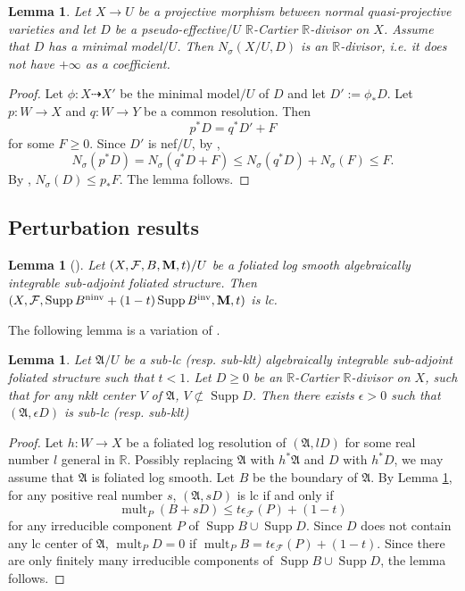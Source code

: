 \documentclass[12pt]{amsart}
\numberwithin{equation}{section}
\newcommand{\Mm}{{\bf{M}}}
\newcommand{\Rr}{\mathbb{R}}
\newcommand{\ninv}{\operatorname{ninv}}
\newcommand{\inv}{\operatorname{inv}}
\newcommand{\Supp}{\operatorname{Supp}}
\newcommand{\mult}{\operatorname{mult}}
\newcommand{\Aa}{{\mathfrak{A}}}
\newcommand{\Ff}{\mathcal{F}}
\newtheorem{lem}[thm]{Lemma}
\theoremstyle{definition}
\theoremstyle{definition}
\theoremstyle{definition}
\begin{document}
\begin{lem}\label{lem: minimal model implies nsigma not infinity}
    Let $X\rightarrow U$ be a projective morphism between normal quasi-projective varieties and let $D$ be a pseudo-effective$/U$ $\Rr$-Cartier $\Rr$-divisor on $X$. Assume that $D$ has a minimal model$/U$. Then $N_{\sigma}(X/U,D)$ is an $\Rr$-divisor, i.e. it does not have $+\infty$ as a coefficient.
\end{lem}
\begin{proof}
Let $\phi\colon X\dashrightarrow X'$ be the minimal model$/U$ of $D$ and let $D':=\phi_*D$. Let $p: W\rightarrow X$ and $q: W\rightarrow Y$ be a common resolution. Then
$$p^*D=q^*D'+F$$
for some $F\geq 0$. Since $D'$ is nef$/U$, by \cite[Lemma 3.3(1)(2)]{LX23},
$$N_{\sigma}(p^*D)=N_{\sigma}(q^*D+F)\leq N_{\sigma}(q^*D)+N_{\sigma}(F)\leq F.$$
By \cite[Lemma 3.4(3)]{LX23}, $N_{\sigma}(D)\leq p_*F$. The lemma follows.
\end{proof}



\subsection{Perturbation results}

\begin{lem}[{\cite[Lemma 2.14]{CHLMSSX24}}]\label{lem: foliated log smooth imply lc}
Let $(X,\Ff,B,\Mm,t)/U$ be a foliated log smooth algebraically integrable sub-adjoint foliated structure. Then $(X,\Ff,\Supp B^{\ninv}+(1-t)\Supp B^{\inv},\Mm,t)$ is lc.
\end{lem}

The following lemma is a variation of \cite[Lemma 3.2]{CHLMSSX24}.

\begin{lem}\label{lem: add divisor not containing lc center}
Let $\Aa/U$ be a sub-lc (resp. sub-klt) algebraically integrable sub-adjoint foliated structure such that $t<1$. Let $D\geq 0$ be an $\Rr$-Cartier $\Rr$-divisor on $X$, such that for any nklt center $V$ of $\Aa$, $V\not\subset\Supp D$. Then there exists $\epsilon>0$ such that $(\Aa,\epsilon D)$ is sub-lc (resp. sub-klt)
\end{lem}
\begin{proof}
    Let $h: W\rightarrow X$ be a foliated log resolution of $(\Aa,lD)$ for some real number $l$ general in $\mathbb R$.
    Possibly replacing $\Aa$ with $h^*\Aa$ and $D$ with $h^*D$, we may assume that $\Aa$ is foliated log smooth. Let $B$ be the boundary of $\Aa$. By Lemma \ref{lem: foliated log smooth imply lc}, for any positive real number $s$, $(\Aa,sD)$ is lc if and only if
    $$\mult_P(B+sD)\leq t\epsilon_{\Ff}(P)+(1-t)$$
    for any irreducible component $P$ of $\Supp B\cup\Supp D$. Since $D$ does not contain any lc center of $\Aa$, $\mult_PD=0$ if $\mult_PB=t\epsilon_{\Ff}(P)+(1-t)$. Since there are only finitely many  irreducible components of $\Supp B\cup\Supp D$, the lemma follows.
\end{proof}
\end{document}
